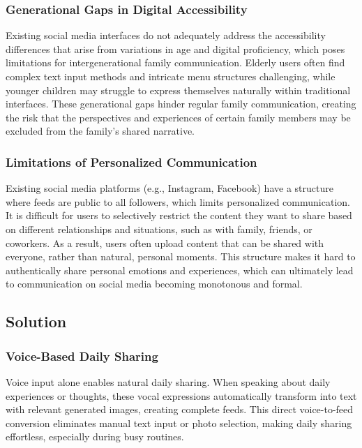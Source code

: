         \subsubsection{Generational Gaps in Digital Accessibility}
        Existing social media interfaces do not adequately address the accessibility differences that arise from variations in age and digital proficiency, which poses limitations for intergenerational family communication. Elderly users often find complex text input methods and intricate menu structures challenging, while younger children may struggle to express themselves naturally within traditional interfaces. These generational gaps hinder regular family communication, creating the risk that the perspectives and experiences of certain family members may be excluded from the family's shared narrative.
        
        \subsubsection{Limitations of Personalized Communication}

 Existing social media platforms (e.g., Instagram, Facebook) have a structure where feeds are public to all followers, which limits personalized communication. It is difficult for users to selectively restrict the content they want to share based on different relationships and situations, such as with family, friends, or coworkers. As a result, users often upload content that can be shared with everyone, rather than natural, personal moments. This structure makes it hard to authentically share personal emotions and experiences, which can ultimately lead to communication on social media becoming monotonous and formal.


    \subsection{Solution}
        \subsubsection{Voice-Based Daily Sharing}
        Voice input alone enables natural daily sharing. When speaking about daily experiences or thoughts, these vocal expressions automatically transform into text with relevant generated images, creating complete feeds. This direct voice-to-feed conversion eliminates manual text input or photo selection, making daily sharing effortless, especially during busy routines.

